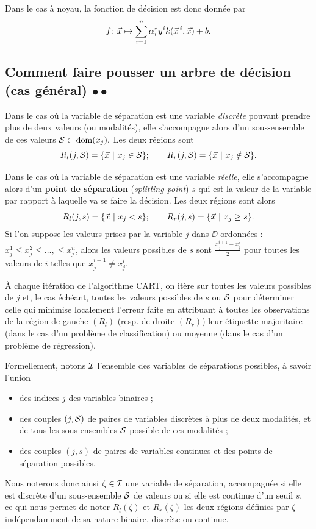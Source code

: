 Dans le cas à noyau, la fonction de décision est donc donnée par 
\begin{equation*}
  f\colon \xx \mapsto \sum_{i=1}^n \alpha_i^* y^i k(\xx^i, \xx) + b.
\end{equation*}

\subsection{Comment faire pousser un arbre de décision (cas général) $\bullet \bullet$}
\label{sec:grow_tree}
Dans le cas où la variable de séparation est une variable {\it discrète}
pouvant prendre plus de deux valeurs (ou modalités), elle s'accompagne alors
d'un sous-ensemble de ces valeurs $\mathcal{S} \subset \text{dom}(x_j).$ Les deux
régions sont
\begin{equation*}
  R_l(j, \Scal) = \{\xx~|~x_j \in \Scal\} ; \hspace{2em} 
  R_r(j, \Scal) = \{\xx~|~x_j \notin  \Scal\}.
\end{equation*}

Dans le cas où la variable de séparation est une variable {\it réelle},
elle s'accompagne alors d'un \textbf{point de séparation} ({\it splitting
  point}) $s$ qui est la valeur de la variable par rapport à laquelle va se
faire la décision. Les deux régions sont alors
\begin{equation*}
  R_l(j, s) = \{\xx~|~x_j < s\} ; \hspace{2em} R_r(j, s) = \{\xx~|~x_j \geq s\}.
\end{equation*}
Si l'on suppose les valeurs prises par la variable $j$ dans $\DD$ ordonnées :
$x_j^1 \leq x_j^2 \leq \dots, \leq x_j^n$, alors les valeurs possibles de $s$
sont $\frac{x^{i+1}_j - x^i_j}2$ pour toutes les valeurs de $i$ telles que
$x^{i+1}_j \neq x^i_j.$


À chaque itération de l'algorithme CART, on itère sur toutes les valeurs
possibles de $j$ et, le cas échéant, toutes les valeurs possibles de $s$ ou
$\mathcal{S}$ pour déterminer celle qui minimise localement l'erreur faite en
attribuant à toutes les observations de la région de gauche $(R_l)$ (resp. de
droite $(R_r)$) leur étiquette majoritaire (dans le cas d'un problème de
classification) ou moyenne (dans le cas d'un problème de régression).


Formellement, notons $\mathcal{I}$ l'ensemble des variables de
séparations possibles, à savoir l'union
\begin{itemize}
\item des indices $j$ des variables binaires ;
\item des couples $(j, \mathcal{S})$ de paires de variables discrètes à plus de deux
  modalités, et de tous les sous-ensembles $\mathcal{S}$ possible de ces modalités ;
\item des couples $(j, s)$ de paires de variables continues et des points de
  séparation possibles.
\end{itemize}
Nous noterons donc ainsi $\zeta \in \mathcal{I}$ une variable de séparation,
accompagnée si elle est discrète d'un sous-ensemble $\mathcal{S}$ de valeurs ou si
elle est continue d'un seuil $s$, ce qui nous permet de noter $R_l(\zeta)$ et
$R_r(\zeta)$ les deux régions définies par $\zeta$ indépendamment de sa nature
binaire, discrète ou continue.

